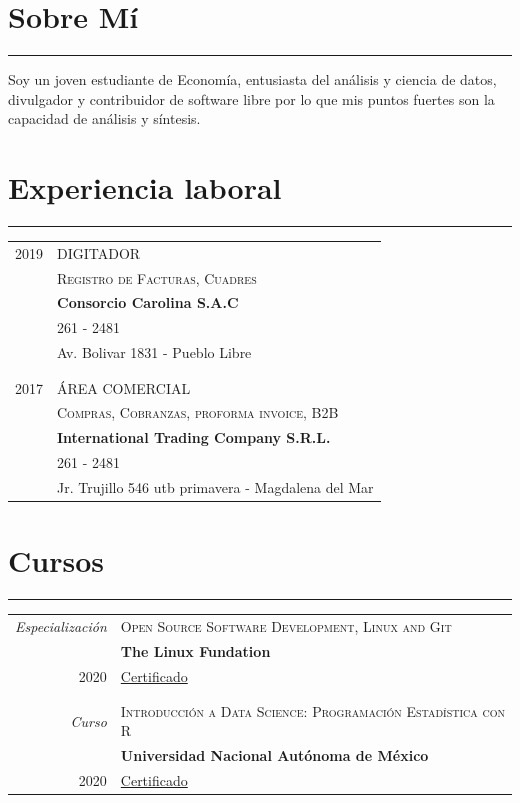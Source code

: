 \documentclass[a4paper,10pt]{article}
\newcommand{\tvspace}{\footnotesize{}\\\multicolumn{2}{c}{}}
\begin{document}
\section{Sobre Mí}
	\hrule

	Soy un joven estudiante de Economía, entusiasta del análisis y ciencia de datos, divulgador y contribuidor de software libre por lo que mis puntos fuertes son la capacidad de análisis y síntesis.

\section{Experiencia laboral}
	\hrule
	\begin{tabular}{r|p{11cm}}
		\textsc{2019}             & \textsc{DIGITADOR}\\
				                      & \textsc{Registro de Facturas, Cuadres}\\
				                      & \textbf{Consorcio Carolina S.A.C} \\
				                      & 261 - 2481 \\
				                      & Av. Bolivar 1831 - Pueblo Libre\\
															& \tvspace \\

		\textsc{2017}             & \textsc{ÁREA COMERCIAL}\\
				                      & \textsc{Compras, Cobranzas, proforma invoice, B2B}\\
				                      & \textbf{International Trading Company S.R.L.} \\
				                      & 261 - 2481 \\
				                      & Jr. Trujillo 546 utb primavera - Magdalena del Mar
	\end{tabular}

\newpage

\section{Cursos}
\hrule

	\begin{tabular}{r|p{11cm}}
 		\emph{Especialización}       & \textsc{Open Source Software Development, Linux and Git}\\
				                         & \textbf{The Linux Fundation}\\
		\textsc{2020}                & \href{https://www.coursera.org/verify/specialization/S9NNU5BM4SWU}{Certificado}\\
				                         & \tvspace \\

  	\emph{Curso}                 & \textsc{Introducción a Data Science: Programación Estadística con R}\\
				                         & \textbf{Universidad Nacional Autónoma de México}\\
		\textsc{2020}                & \href{https://www.coursera.org/verify/V6A9ZS2CMAP2}{Certificado}\\
	\end{tabular}
\end{document}
